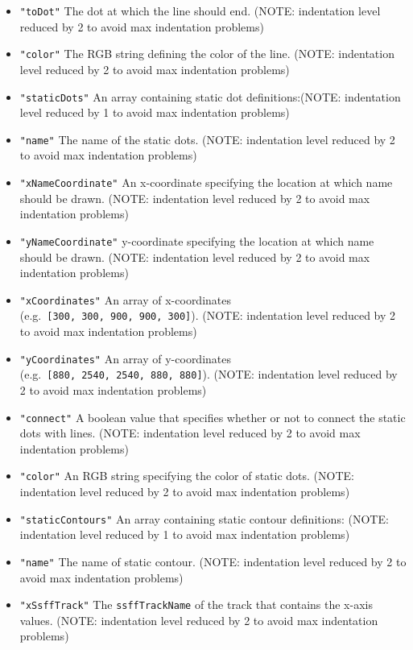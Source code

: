 \documentclass[
]{book}
\begin{document}
\begin{itemize}
\begin{itemize}
\begin{itemize}
\begin{itemize}
      \item
        \texttt{"toDot"} The dot at which the line should end. (NOTE: indentation level reduced by 2 to avoid max indentation problems)
      \item
        \texttt{"color"} The RGB string defining the color of the line. (NOTE: indentation level reduced by 2 to avoid max indentation problems)
      \item
        \texttt{"staticDots"} An array containing static dot definitions:(NOTE: indentation level reduced by 1 to avoid max indentation problems)
      \item
        \texttt{"name"} The name of the static dots. (NOTE: indentation level reduced by 2 to avoid max indentation problems)
      \item
        \texttt{"xNameCoordinate"} An x-coordinate specifying the location at which name should be drawn. (NOTE: indentation level reduced by 2 to avoid max indentation problems)
      \item
        \texttt{"yNameCoordinate"} y-coordinate specifying the location at which name should be drawn. (NOTE: indentation level reduced by 2 to avoid max indentation problems)
      \item
        \texttt{"xCoordinates"} An array of x-coordinates (e.g.~\texttt{{[}300,~300,~900,~900,~300{]}}). (NOTE: indentation level reduced by 2 to avoid max indentation problems)
      \item
        \texttt{"yCoordinates"} An array of y-coordinates (e.g.~\texttt{{[}880,~2540,~2540,~880,~880{]}}). (NOTE: indentation level reduced by 2 to avoid max indentation problems)
      \item
        \texttt{"connect"} A boolean value that specifies whether or not to connect the static dots with lines. (NOTE: indentation level reduced by 2 to avoid max indentation problems)
      \item
        \texttt{"color"} An RGB string specifying the color of static dots. (NOTE: indentation level reduced by 2 to avoid max indentation problems)
      \item
        \texttt{"staticContours"} An array containing static contour definitions: (NOTE: indentation level reduced by 1 to avoid max indentation problems)
      \item
        \texttt{"name"} The name of static contour. (NOTE: indentation level reduced by 2 to avoid max indentation problems)
      \item
        \texttt{"xSsffTrack"} The \texttt{ssffTrackName} of the track that contains the x-axis values. (NOTE: indentation level reduced by 2 to avoid max indentation problems)

\end{itemize}
\end{itemize}
\end{itemize}
\end{itemize}
\end{document}
